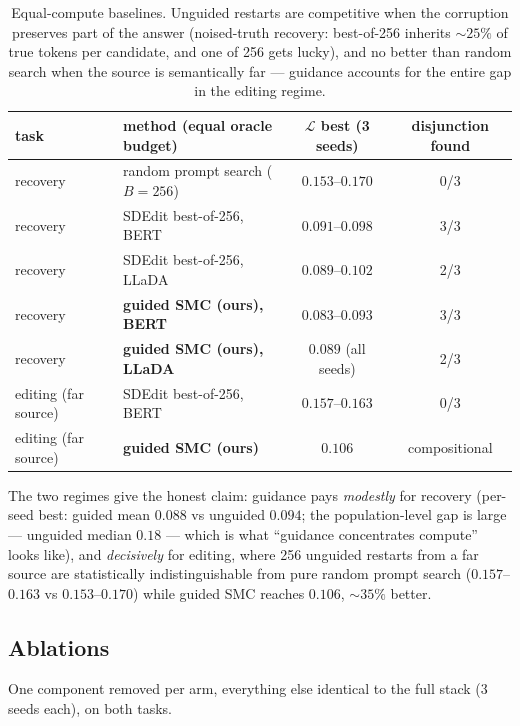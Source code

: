 \documentclass[11pt]{article}
\newcommand{\Ploss}{\mathcal{L}}
\begin{document}
\begin{table}[h]
\centering\small
\begin{tabular}{llcc}
\toprule
task & method (equal oracle budget) & $\Ploss$ best (3 seeds) & disjunction found \\
\midrule
recovery & random prompt search ($B{=}256$) & $0.153$--$0.170$ & 0/3 \\
recovery & SDEdit best-of-256, BERT     & $0.091$--$0.098$ & 3/3 \\
recovery & SDEdit best-of-256, LLaDA    & $0.089$--$0.102$ & 2/3 \\
recovery & \textbf{guided SMC (ours), BERT}  & $\mathbf{0.083}$--$0.093$ & 3/3 \\
recovery & \textbf{guided SMC (ours), LLaDA} & $\mathbf{0.089}$ (all seeds) & 2/3 \\
\midrule
editing (far source) & SDEdit best-of-256, BERT & $0.157$--$0.163$ & 0/3 \\
editing (far source) & \textbf{guided SMC (ours)} & $\mathbf{0.106}$ & compositional \\
\bottomrule
\end{tabular}
\caption{Equal-compute baselines. Unguided restarts are competitive when
the corruption preserves part of the answer (noised-truth recovery:
best-of-256 inherits ${\sim}25\%$ of true tokens per candidate, and one of
256 gets lucky), and no better than random search when the source is
semantically far --- guidance accounts for the entire gap in the editing
regime.}
\end{table}

The two regimes give the honest claim: guidance pays \emph{modestly} for
recovery (per-seed best: guided mean $0.088$ vs unguided $0.094$; the
population-level gap is large --- unguided median $0.18$ --- which is what
``guidance concentrates compute'' looks like), and \emph{decisively} for
editing, where 256 unguided restarts from a far source are statistically
indistinguishable from pure random prompt search ($0.157$--$0.163$ vs
$0.153$--$0.170$) while guided SMC reaches $0.106$, ${\sim}35\%$ better.

\subsection{Ablations}
\label{sec:ablations}
One component removed per arm, everything else identical to the full
stack (3 seeds each), on both tasks.
\end{document}
